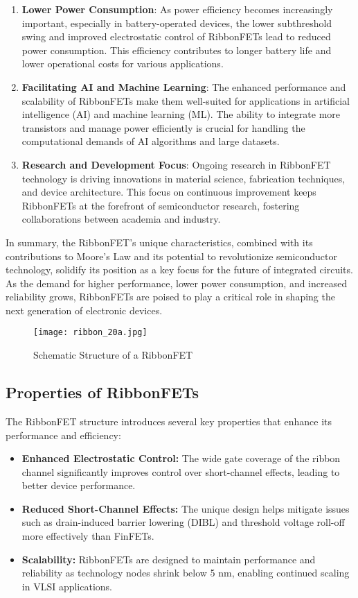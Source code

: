 \documentclass[12pt]{report}
\begin{document}
\begin{titlepage}
\begin{enumerate}
    \item \textbf{Lower Power Consumption}: As power efficiency becomes increasingly important, especially in battery-operated devices, the lower subthreshold swing and improved electrostatic control of RibbonFETs lead to reduced power consumption. This efficiency contributes to longer battery life and lower operational costs for various applications.

    \item \textbf{Facilitating AI and Machine Learning}: The enhanced performance and scalability of RibbonFETs make them well-suited for applications in artificial intelligence (AI) and machine learning (ML). The ability to integrate more transistors and manage power efficiently is crucial for handling the computational demands of AI algorithms and large datasets.

    \item \textbf{Research and Development Focus}: Ongoing research in RibbonFET technology is driving innovations in material science, fabrication techniques, and device architecture. This focus on continuous improvement keeps RibbonFETs at the forefront of semiconductor research, fostering collaborations between academia and industry.
\end{enumerate}

In summary, the RibbonFET's unique characteristics, combined with its contributions to Moore's Law and its potential to revolutionize semiconductor technology, solidify its position as a key focus for the future of integrated circuits. As the demand for higher performance, lower power consumption, and increased reliability grows, RibbonFETs are poised to play a critical role in shaping the next generation of electronic devices.

\begin{figure}[h]
    \centering
    \texttt{[image: ribbon\_20a.jpg]} %
    \caption{Schematic Structure of a RibbonFET}
    \label{fig:ribbonfet_structure}
\end{figure}


\subsection{Properties of RibbonFETs}
The RibbonFET structure introduces several key properties that enhance its performance and efficiency:
\begin{itemize}
    \item \textbf{Enhanced Electrostatic Control:} The wide gate coverage of the ribbon channel significantly improves control over short-channel effects, leading to better device performance.
    \item \textbf{Reduced Short-Channel Effects:} The unique design helps mitigate issues such as drain-induced barrier lowering (DIBL) and threshold voltage roll-off more effectively than FinFETs.
    \item \textbf{Scalability:} RibbonFETs are designed to maintain performance and reliability as technology nodes shrink below 5 nm, enabling continued scaling in VLSI applications.
\end{itemize}


\end{titlepage}
\end{document}
